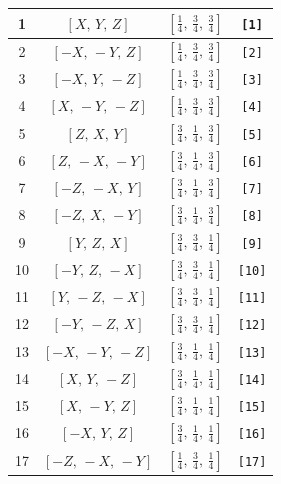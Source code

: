 \documentclass[fleqn,8pt]{jsarticle}
\begin{document}
\begin{longtable}{cccc}
1 & $\left[ X,\, Y,\, Z \right]$ & $\left[ \frac{1}{4},\, \frac{3}{4},\, \frac{3}{4} \right]$ & {\tt [1]} \\ \hline
2 & $\left[ - X,\, - Y,\, Z \right]$ & $\left[ \frac{1}{4},\, \frac{3}{4},\, \frac{3}{4} \right]$ & {\tt [2]} \\ \hline
3 & $\left[ - X,\, Y,\, - Z \right]$ & $\left[ \frac{1}{4},\, \frac{3}{4},\, \frac{3}{4} \right]$ & {\tt [3]} \\ \hline
4 & $\left[ X,\, - Y,\, - Z \right]$ & $\left[ \frac{1}{4},\, \frac{3}{4},\, \frac{3}{4} \right]$ & {\tt [4]} \\ \hline
5 & $\left[ Z,\, X,\, Y \right]$ & $\left[ \frac{3}{4},\, \frac{1}{4},\, \frac{3}{4} \right]$ & {\tt [5]} \\ \hline
6 & $\left[ Z,\, - X,\, - Y \right]$ & $\left[ \frac{3}{4},\, \frac{1}{4},\, \frac{3}{4} \right]$ & {\tt [6]} \\ \hline
7 & $\left[ - Z,\, - X,\, Y \right]$ & $\left[ \frac{3}{4},\, \frac{1}{4},\, \frac{3}{4} \right]$ & {\tt [7]} \\ \hline
8 & $\left[ - Z,\, X,\, - Y \right]$ & $\left[ \frac{3}{4},\, \frac{1}{4},\, \frac{3}{4} \right]$ & {\tt [8]} \\ \hline
9 & $\left[ Y,\, Z,\, X \right]$ & $\left[ \frac{3}{4},\, \frac{3}{4},\, \frac{1}{4} \right]$ & {\tt [9]} \\ \hline
10 & $\left[ - Y,\, Z,\, - X \right]$ & $\left[ \frac{3}{4},\, \frac{3}{4},\, \frac{1}{4} \right]$ & {\tt [10]} \\ \hline
11 & $\left[ Y,\, - Z,\, - X \right]$ & $\left[ \frac{3}{4},\, \frac{3}{4},\, \frac{1}{4} \right]$ & {\tt [11]} \\ \hline
12 & $\left[ - Y,\, - Z,\, X \right]$ & $\left[ \frac{3}{4},\, \frac{3}{4},\, \frac{1}{4} \right]$ & {\tt [12]} \\ \hline
13 & $\left[ - X,\, - Y,\, - Z \right]$ & $\left[ \frac{3}{4},\, \frac{1}{4},\, \frac{1}{4} \right]$ & {\tt [13]} \\ \hline
14 & $\left[ X,\, Y,\, - Z \right]$ & $\left[ \frac{3}{4},\, \frac{1}{4},\, \frac{1}{4} \right]$ & {\tt [14]} \\ \hline
15 & $\left[ X,\, - Y,\, Z \right]$ & $\left[ \frac{3}{4},\, \frac{1}{4},\, \frac{1}{4} \right]$ & {\tt [15]} \\ \hline
16 & $\left[ - X,\, Y,\, Z \right]$ & $\left[ \frac{3}{4},\, \frac{1}{4},\, \frac{1}{4} \right]$ & {\tt [16]} \\ \hline
17 & $\left[ - Z,\, - X,\, - Y \right]$ & $\left[ \frac{1}{4},\, \frac{3}{4},\, \frac{1}{4} \right]$ & {\tt [17]} \\ \hline

\end{longtable}
\end{document}
